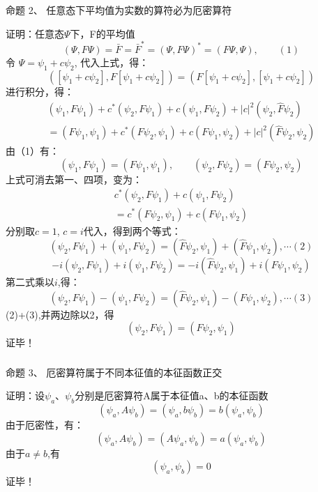 \begin{frame} [allowframebreaks=]
    \frametitle{}
    \begin{atcbox}{命题 2、}
    任意态下平均值为实数的算符必为厄密算符
    \end{atcbox}
    \alert{证明：}任意态$\Psi$下，F的平均值
    $$(\Psi,F\Psi)=\bar{F}=\bar{F}^*=(\Psi,F\Psi)^*=(F\Psi,\Psi), \qquad (1) $$
    令 $\Psi= \psi_1+c\psi_2 $, 代入上式，得：
    $$([\psi_1+c\psi_2],F [\psi_1+c\psi_2])=(F[\psi_1+c\psi_2],[\psi_1+c\psi_2]) $$
    进行积分，得：
    $$
    \begin{array}{r}
    \left(\psi_{1}, F \psi_{1}\right)+c^{*}\left(\psi_{2}, F \psi_{1}\right)+c\left(\psi_{1}, F \psi_{2}\right)+|c|^{2}\left(\psi_{2}, \hat{F} \psi_{2}\right) \\
    =\left(F \psi_{1}, \psi_{1}\right)+c^{*}\left(F \psi_{2}, \psi_{1}\right)+c\left(F \psi_{1}, \psi_{2}\right)+|c|^{2}\left(\hat{F} \psi_{2}, \psi_{2}\right)
    \end{array}
    $$
    由（1）有： 
    $$(\psi_1,F\psi_1)=(F \psi_1, \psi_1), \qquad (\psi_2,F\psi_2)=(F \psi_2, \psi_2) $$
    上式可消去第一、四项，变为：
    $$\begin{array}{r}
        c^{*}\left(\psi_{2}, F \psi_{1}\right)+c\left(\psi_{1}, F \psi_{2}\right) \\
        =c^{*}\left(F \psi_{2}, \psi_{1}\right)+c\left(F \psi_{1}, \psi_{2}\right)
    \end{array}$$
    分别取$c=1$, $c=i$代入，得到两个等式：
    $$  \left(\psi_{2}, F \psi_{1}\right)+\left(\psi_{1}, F \psi_{2}\right) = 
    \left(\hat{F} \psi_{2}, \psi_{1}\right)+\left(\hat{F} \psi_{1}, \psi_{2}\right) , \cdots (2)
    $$
    $$
    -i\left(\psi_{2}, F \psi_{1}\right)+i\left(\psi_{1}, F \psi_{2}\right) 
    =-i\left(\hat{F} \psi_{2}, \psi_{1}\right)+i\left(F \psi_{1}, \psi_{2}\right)
    $$
    第二式乘以$i$,得：
    $$
    \left(\psi_{2}, F \psi_{1}\right)-\left(\psi_{1}, F \psi_{2}\right) 
    =\left(\hat{F} \psi_{2}, \psi_{1}\right)-\left(F \psi_{1}, \psi_{2}\right), \cdots (3)
    $$
    (2)+(3),并两边除以2，得
    $$
    \left(\psi_{2}, F \psi_{1}\right) =\left(F \psi_{2}, \psi_{1}\right)
    $$
    证毕！
\end{frame} 
\begin{frame} [allowframebreaks=]
    \frametitle{}
    \begin{atcbox}{命题 3、}
    厄密算符属于不同本征值的本征函数正交
     \end{atcbox}
    \alert{证明：}设$\psi_a$、$\psi_b$分别是厄密算符A属于本征值a、b的本征函数
    \begin{equation*}
        (\psi_a, A\psi_b)=(\psi_a, b\psi_b)=b(\psi_a, \psi_b)
    \end{equation*}  
    由于厄密性，有：
    \begin{equation*}
        (\psi_a, A\psi_b)=(A\psi_a, \psi_b)=a(\psi_a, \psi_b)
    \end{equation*}
    由于$a\neq b$,有
    \begin{equation*}
        (\psi_a, \psi_b)=0
    \end{equation*}
   证毕！
\end{frame} 

